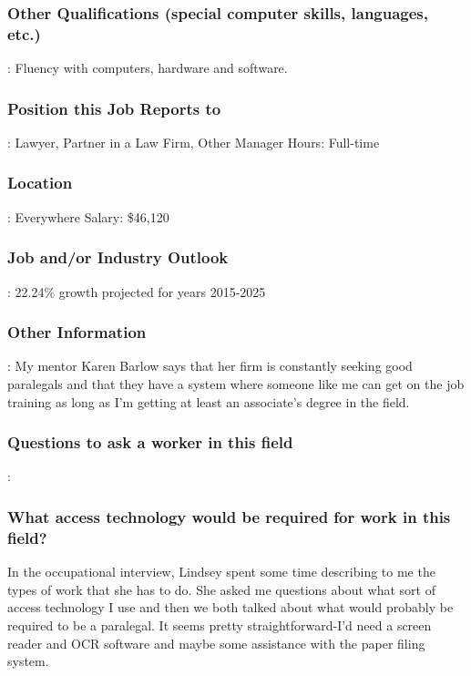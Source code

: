 \subsubsection*{Other Qualifications (special computer skills, languages, etc.)}: Fluency with computers, hardware and software.

\subsubsection*{Position this Job Reports to}: Lawyer, Partner in a Law Firm, Other Manager Hours: Full-time

\subsubsection*{Location}: Everywhere Salary: \$46,120

\subsubsection*{Job and/or Industry Outlook}: 22.24\% growth projected for years 2015-2025

\subsubsection*{Other Information}: My mentor Karen Barlow says that her firm is constantly seeking good paralegals and that they have a system where someone like me can get on the job training as long as I'm getting at least an associate's degree in the field.

\subsubsection*{Questions to ask a worker in this field}:

\subsubsection*{What access technology would be required for work in this field?}

In the occupational interview, Lindsey spent some time describing to me the types of work that she has to do. She asked me questions about what sort of access technology I use and then we both talked about what would probably be required to be a paralegal. It seems pretty straightforward-I'd need a screen reader and OCR software and maybe some assistance with the paper filing system.

